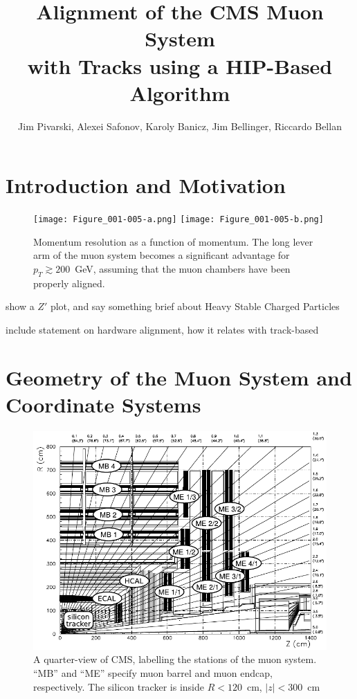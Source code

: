 \documentclass[12pt]{article}
\title{Alignment of the CMS Muon System \\ with Tracks using a HIP-Based Algorithm}
\author{Jim Pivarski, Alexei Safonov, Karoly Banicz, Jim Bellinger, Riccardo Bellan}
\begin{document}
\maketitle

\section{Introduction and Motivation}

\begin{figure}
\begin{center} \texttt{[image: Figure\_001-005-a.png]} \texttt{[image: Figure\_001-005-b.png]} \end{center}
\caption{Momentum resolution as a function of momentum.  The long
  lever arm of the muon system becomes a significant advantage for
  $p_T \gtrsim 200$~GeV, assuming that the muon chambers have been
  properly aligned. \label{fig:tdr_momentum_resolution}}
\end{figure}

show a $Z'$ plot, and say something brief about Heavy Stable Charged Particles

include statement on hardware alignment, how it relates with track-based

\section{Geometry of the Muon System and Coordinate Systems}

\begin{figure}
\begin{center} \includegraphics[width=\linewidth]{muon_system_labeled.pdf} \end{center}
\caption{A quarter-view of CMS, labelling the stations of the muon
  system.  ``MB'' and ``ME'' specify muon barrel and muon endcap,
  respectively.  The silicon tracker is inside $R < 120$~cm, $|z| <
  300$~cm \label{fig:muon_system_labeled}}
\end{figure}
\end{document}
